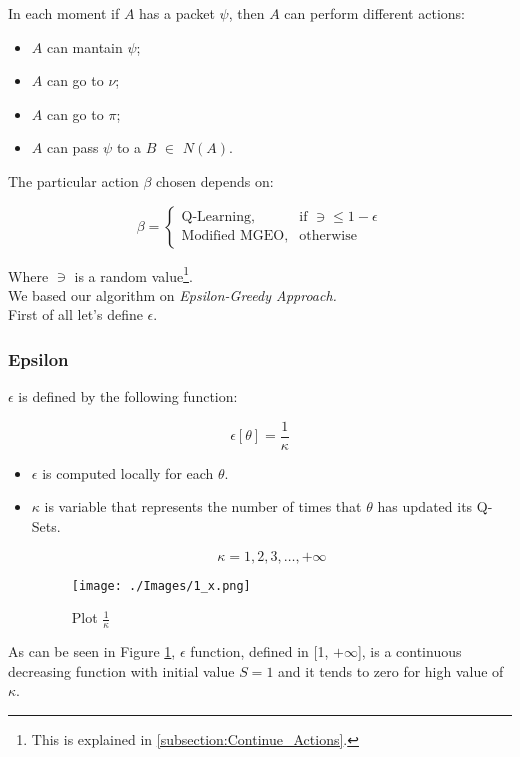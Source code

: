 \documentclass[12pt]{article}
\begin{document}
In each moment if $A$ has a packet $\psi$, then $A$ can perform different actions:


\begin{itemize}

    \item $A$ can mantain $\psi$;

    \item $A$ can go to $\nu$;

    \item $A$ can go to $\pi$;

    \item $A$ can pass $\psi$ to a $B$ $\in$ $N(A)$.
    
\end{itemize}
    
The particular action $\beta$ chosen depends on:

\[
    \beta= 
    \begin{cases}
        \text{Q-Learning},& \text{if } \ni\leq 1-\epsilon\\
        \text{Modified MGEO},& \text{otherwise}
    \end{cases}
\]

Where $\ni$ is a random value\footnote{This is explained in \ref{subsection:Continue_Actions}.}. \\

We based our algorithm on \textit{Epsilon-Greedy Approach.} \\

First of all let's define $\epsilon$.

\subsubsection{Epsilon}

$\epsilon$ is defined by the following function:

\[
    \epsilon[\theta] = \frac{1}{\kappa}
\]

\begin{itemize}

    \item $\epsilon$ is computed locally for each $\theta$.

    \item $\kappa$ is variable that represents the number of times that $\theta$ has updated its Q-Sets.

    \[
        \kappa = 1, 2, 3,\dots,+\infty
    \]

    \begin{figure}[H]

        \texttt{[image: ./Images/1\_x.png]}
                
        \caption{Plot $\frac{1}{\kappa}$}
                
    \label{fig:figure1}
    \end{figure}

\end{itemize}
As can be seen in Figure \ref{fig:figure1}, $\epsilon$ function, defined in [1, $+\infty$], is a continuous decreasing function with initial value $S = 1$ and it tends to zero for high value of $\kappa$.
\end{document}

